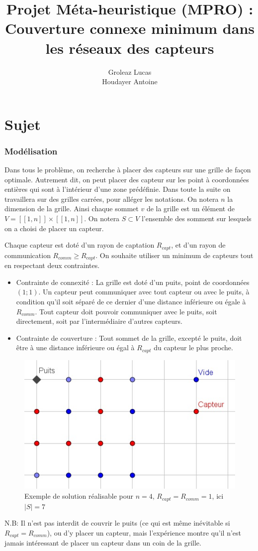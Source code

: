 \documentclass[12pt,a4paper]{article}
\title{Projet Méta-heuristique (MPRO) : Couverture connexe minimum dans les réseaux des capteurs}
\author{Groleaz Lucas \\ Houdayer Antoine}
\begin{document}
\maketitle
\tableofcontents
\part{Sujet}
\section{Modélisation}
Dans tous le problème, on recherche à placer des capteurs sur une grille de façon optimale. Autrement dit, on peut placer des capteur sur les point à coordonnées entières qui sont à l'intérieur d'une zone prédéfinie. Dans toute la suite on travaillera sur des grilles carrées, pour alléger les notations. On notera $n$ la dimension de la grille. Ainsi chaque sommet $v$ de la grille est un élément de $V=[\![1,n]\!]\times [\![1,n]\!]$. On notera $S\subset V$ l'ensemble des somment sur lesquels on a choisi de placer un capteur. 

Chaque capteur est doté d'un rayon de captation $R_{capt}$, et d'un rayon de communication $R_{comm}\geq R_{capt}$.  On souhaite utiliser un minimum de capteurs tout en respectant deux contraintes.
\begin{itemize}
\item Contrainte de connexité : La grille est doté d'un puits, point de coordonnées $(1;1)$. Un capteur peut communiquer avec tout capteur ou avec le puits, à condition qu'il soit séparé de ce dernier d'une distance inférieure ou égale à $R_{comm}$. Tout capteur doit pouvoir communiquer avec le puits, soit directement, soit par l'intermédiaire d'autres capteurs. 

\item Contrainte de couverture : Tout sommet de la grille, excepté le puits, doit être à une distance inférieure ou égal à $R_{capt}$ du capteur le plus proche.

\end{itemize}
\begin{figure}[!h]
\center
\includegraphics[scale=1]{Images/4_1_1_realisable.jpg}
\caption{Exemple de solution réalisable pour $n=4$, $R_{capt}=R_{comm}=1$, ici $|S|=7$}
\end{figure}
N.B: Il n'est pas interdit de couvrir le puits (ce qui est même inévitable si $R_{capt}=R_{comm}$), ou d'y placer un capteur, mais l'expérience montre qu'il n'est jamais intéressant de placer un capteur dans un coin de la grille. 
\end{document}
